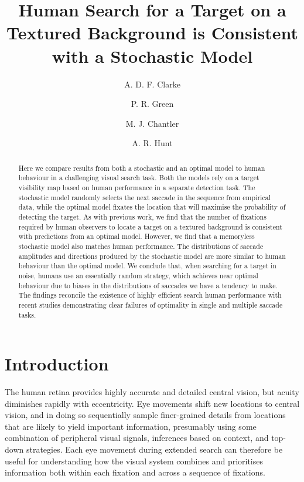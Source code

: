 \documentclass[preprint, authoryear]{elsarticle} %
\begin{document}
\title{Human Search for a Target on a Textured Background is Consistent with a Stochastic Model}
\author[abdn]{A. D. F. Clarke}
\author[hw]{P. R. Green}
\author[hw]{M. J. Chantler}
\author[abdn]{A. R. Hunt}
\address[abdn]{School of Psychology, King's College, University of Aberdeen, Aberdeen, United Kingdom}
\address[hw]{School of Mathematical and Computer Sciences, Heriot-Watt University, Edinburgh, United Kingdom}

\begin{abstract}
Here we compare results from both a stochastic and an optimal model to human behaviour in a challenging visual search task. Both the models rely on a target visibility map based on human performance in a separate detection task. The stochastic model randomly selects the next saccade in the sequence from empirical data, while the optimal model fixates the location that will maximise the probability of detecting the target. As with previous work, we find that the number of fixations required by human observers to locate a target on a textured background is consistent with predictions from an optimal model. However, we find that a memoryless stochastic model also matches human performance. The distributions of saccade amplitudes and directions produced by the stochastic model are more similar to human behaviour than the optimal model. We conclude that, when searching for a target in noise, humans use an essentially random strategy, which achieves near optimal behaviour due to biases in the distributions of saccades we have a tendency to make. The findings reconcile the existence of highly efficient search human performance with recent studies demonstrating clear failures of optimality in single and multiple saccade tasks.
\end{abstract}

\maketitle

\section{Introduction}
The human retina provides highly accurate and detailed central vision, but acuity diminishes rapidly with eccentricity. Eye movements shift new locations to central vision, and in doing so sequentially sample finer-grained details from locations that are likely to yield important information, presumably using some combination of peripheral visual signals, inferences based on context, and top-down strategies. Each eye movement during extended search can therefore be useful for understanding how the visual system combines and prioritises information both within each fixation and across a sequence of fixations.
\end{document}
